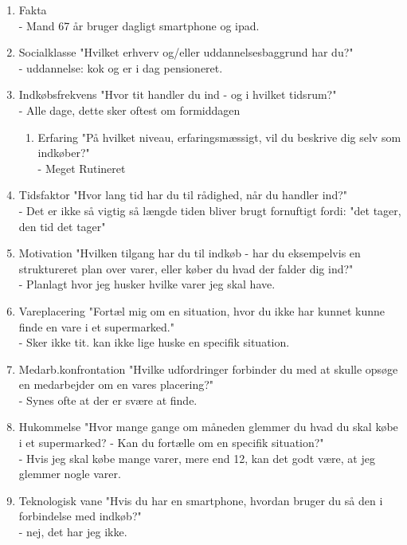 \begin{enumerate}
\begin{enumerate}
\begin{enumerate}
\item Fakta\\
  - Mand 67 år bruger dagligt smartphone og ipad.
\item Socialklasse "Hvilket erhverv og/eller uddannelsesbaggrund har du?"\\
  - uddannelse: kok og er i dag pensioneret.
\item Indkøbsfrekvens "Hvor tit handler du ind - og i hvilket tidsrum?"\\
  - Alle dage, dette sker oftest om formiddagen
\begin{enumerate}
\item Erfaring	"På hvilket niveau, erfaringsmæssigt, vil du beskrive dig selv som indkøber?"\\
  - Meget Rutineret
\end{enumerate}
\item Tidsfaktor "Hvor lang tid har du til rådighed, når du handler ind?"\\
  - Det er ikke så vigtig så længde tiden bliver brugt fornuftigt fordi: "det tager, den tid det tager"
\item Motivation "Hvilken tilgang har du til indkøb - har du eksempelvis en struktureret plan over varer, eller køber du hvad der falder dig ind?"\\
  - Planlagt hvor jeg husker hvilke varer jeg skal have.
\item  Vareplacering "Fortæl mig om en situation, hvor du ikke har kunnet kunne finde en vare i et supermarked."\\
  - Sker ikke tit. kan ikke lige huske en specifik situation.
\item Medarb.konfrontation "Hvilke udfordringer forbinder du med at skulle opsøge en medarbejder om en vares placering?"\\
  - Synes ofte at der er svære at finde.
\item Hukommelse "Hvor mange gange om måneden glemmer du hvad du skal købe i et supermarked? - Kan du fortælle om en specifik situation?"\\
  - Hvis jeg skal købe mange varer, mere end 12, kan det godt være, at jeg glemmer nogle varer.
\item Teknologisk vane "Hvis du har en smartphone, hvordan bruger du så den i forbindelse med indkøb?"\\
  - nej, det har jeg ikke.


\end{enumerate}
\end{enumerate}
\end{enumerate}
